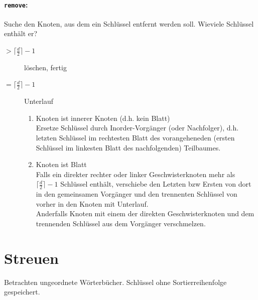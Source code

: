 \documentclass{scrartcl}
\begin{document}
\paragraph{\texttt{remove}:} Suche den Knoten, aus dem ein Schlüssel entfernt werden soll. Wieviele Schlüssel enthält er?
\begin{description}
	\item[$>\lceil\frac{d}{2}\rceil -1$] löschen, fertig
	\item[$=\lceil\frac{d}{2}\rceil -1$] Unterlauf
	\begin{enumerate}
		\item Knoten ist innerer Knoten (d.h. kein Blatt)\\
		Ersetze Schlüssel durch Inorder-Vorgänger (oder Nachfolger), d.h. letzten Schlüssel im rechtesten Blatt des vorangeheneden (ersten Schlüssel im linkesten Blatt des nachfolgenden) Teilbaumes.
		\item Knoten ist Blatt \\
		Falls ein direkter rechter oder linker Geschwisterknoten mehr als $\lceil\frac{d}{2}\rceil -1$ Schlüssel enthält, verschiebe den Letzten bzw Ersten von dort in den gemeinsamen Vorgänger und den trennenten Schlüssel von vorher in den Knoten mit Unterlauf. \\
		Anderfalls Knoten mit einem der direkten Geschwisterknoten und dem trennenden Schlüssel aus dem Vorgänger verschmelzen.
	\end{enumerate}
\end{description}


\section{Streuen}
Betrachten ungeordnete Wörterbücher. Schlüssel ohne Sortierreihenfolge gespeichert.
\end{document}
